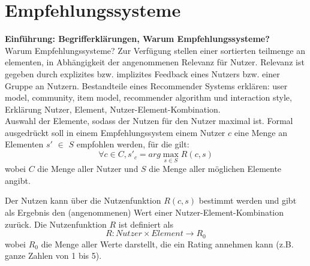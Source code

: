 \section{Empfehlungssysteme}
\textbf{Einführung: Begrifferklärungen, Warum Empfehlungssysteme?}\\
Warum Empfehlungssysteme? Zur Verfügung stellen einer sortierten teilmenge an elementen, in Abhängigkeit der angenommenen Relevanz für Nutzer. %
Relevanz ist gegeben durch explizites bzw. implizites Feedback eines Nutzers bzw. einer Gruppe an Nutzern. %
Bestandteile eines Recommender Systems erklären: user model, community, item model, recommender algorithm und interaction style, Erklärung Nutzer, Element, Nutzer-Element-Kombination.\\ %

Auswahl der Elemente, sodass der Nutzen für den Nutzer maximal ist.
Formal ausgedrückt soll in einem Empfehlungssystem einem Nutzer $c$ eine Menge an Elementen $s'$ $\in$ $S$ empfohlen werden, für die gilt:
\begin{equation} %
    \forall c\in C,  s'_c = arg\max_{s \in S} R(c,s)
\end{equation}
wobei $C$ die Menge aller Nutzer und $S$ die Menge aller möglichen Elemente angibt.

Der Nutzen kann über die Nutzenfunktion $R(c,s)$ bestimmt werden und gibt als Ergebnis den (angenommenen) Wert einer Nutzer-Element-Kombination zurück.
Die Nutzenfunktion $R$ ist definiert als %
\begin{equation}
    R: Nutzer \times Element \rightarrow R_{0}
\end{equation}
wobei $R_{0}$ die Menge aller Werte darstellt, die ein Rating annehmen kann (z.B. ganze Zahlen von  1 bis 5). %

